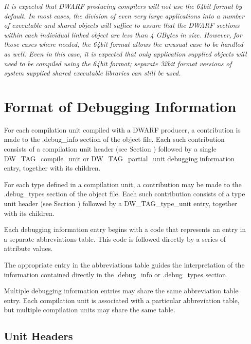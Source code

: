 \textit{It is expected that DWARF producing compilers will not use
the 64\dash bit format by default. In most cases, the division of
even very large applications into a number of executable and
shared objects will suffice to assure that the DWARF sections
within each individual linked object are less than 4 GBytes
in size. However, for those cases where needed, the 64\dash bit
format allows the unusual case to be handled as well. Even
in this case, it is expected that only application supplied
objects will need to be compiled using the 64\dash bit format;
separate 32\dash bit format versions of system supplied shared
executable libraries can still be used.}



\section{Format of Debugging Information}
\label{datarep:formatofdebugginginformation}

For each compilation unit compiled with a DWARF producer,
a contribution is made to the .debug\_info section of
the object file. Each such contribution consists of a
compilation unit header 
(see Section ) 
followed by a
single DW\_TAG\_compile\_unit or DW\_TAG\_partial\_unit debugging
information entry, together with its children.

For each type defined in a compilation unit, a contribution may
be made to the .debug\_types section of the object file. Each
such contribution consists of a type unit header 
(see Section ) 
followed by a DW\_TAG\_type\_unit entry, together with
its children.

Each debugging information entry begins with a code that
represents an entry in a separate abbreviations table. This
code is followed directly by a series of attribute values.

The appropriate entry in the abbreviations table guides the
interpretation of the information contained directly in the
.debug\_info or .debug\_types section.

Multiple debugging information entries may share the same
abbreviation table entry. Each compilation unit is associated
with a particular abbreviation table, but multiple compilation
units may share the same table.
\subsection{Unit Headers}
\label{datarep:unitheaders}

